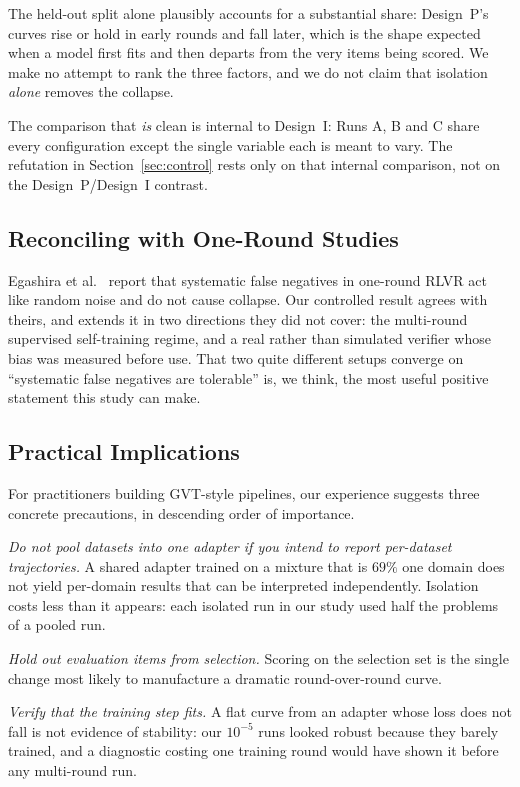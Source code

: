 \documentclass[runningheads]{llncs}
\begin{document}
The held-out split alone plausibly accounts for a substantial share:
Design~P's curves rise or hold in early rounds and fall later, which is the
shape expected when a model first fits and then departs from the very items
being scored. We make no attempt to rank the three factors, and we do not
claim that isolation \emph{alone} removes the collapse.

The comparison that \emph{is} clean is internal to Design~I: Runs A, B and C
share every configuration except the single variable each is meant to vary.
The refutation in Section~\ref{sec:control} rests only on that internal
comparison, not on the Design~P/Design~I contrast.

\subsection{Reconciling with One-Round Studies}

Egashira et al.~\cite{ref_delayplateau} report that systematic false
negatives in one-round RLVR act like random noise and do not cause
collapse. Our controlled result agrees with theirs, and extends it in two
directions they did not cover: the multi-round supervised self-training
regime, and a real rather than simulated verifier whose bias was measured
before use. That two quite different setups converge on ``systematic false
negatives are tolerable'' is, we think, the most useful positive statement
this study can make.

\subsection{Practical Implications}

For practitioners building GVT-style pipelines, our experience suggests
three concrete precautions, in descending order of importance.

\emph{Do not pool datasets into one adapter if you intend to report
per-dataset trajectories.} A shared adapter trained on a mixture that is
$69\%$ one domain does not yield per-domain results that can be interpreted
independently. Isolation costs less than it appears: each isolated run in
our study used half the problems of a pooled run.

\emph{Hold out evaluation items from selection.} Scoring on the selection
set is the single change most likely to manufacture a dramatic
round-over-round curve.

\emph{Verify that the training step fits.} A flat curve from an adapter
whose loss does not fall is not evidence of stability: our $10^{-5}$ runs
looked robust because they barely trained, and a diagnostic costing one
training round would have shown it before any multi-round run.
\end{document}
